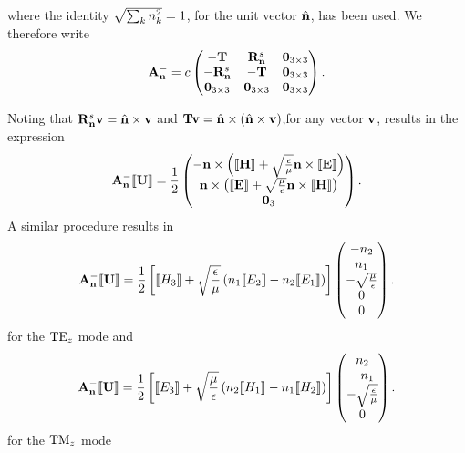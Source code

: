 where the identity $\sqrt{\sum_{k} n_{k}^2} = 1$, for the unit vector $\hat{\mathbf{n}}$, has been used. We therefore write
\begin{align*}
\mathbf{A}_\mathbf{n}^{-} = c
\begin{pmatrix}
  -\mathbf{T} & \mathbf{R}^{s}_{\mathbf{n}} & \mathbf{0}_{3\times3} \\
  -\mathbf{R}^{s}_{\mathbf{n}}  & -\mathbf{T} & \mathbf{0}_{3\times3} \\
   \mathbf{0}_{3\times3} & \mathbf{0}_{3\times3} & \mathbf{0}_{3\times3} 
\end{pmatrix} .
\end{align*}

Noting that $\mathbf{R}^{s}_{\mathbf{n}} \mathbf{v} = \hat{\mathbf{n}} \times \mathbf{v}$ and $\mathbf{T} \mathbf{v} = \hat{\mathbf{n}} \times \left(  \hat{\mathbf{n}}
  \times \mathbf{v} \right)$,for any vector $\mathbf{v}$, results in the expression
\begin{align*}
\mathbf{A}_\mathbf{n}^{-} \llbracket \mathbf{U} \rrbracket = \frac{1}{2}
\begin{pmatrix}
  -\mathbf{n} \times \left( \llbracket \mathbf{H} \rrbracket + \sqrt{\frac{\epsilon}{\mu}} \mathbf{n} \times \llbracket \mathbf{E} \rrbracket \right) \\
   \mathbf{n} \times \left( \llbracket \mathbf{E} \rrbracket + \sqrt{\frac{\mu}{\epsilon}} \mathbf{n} \times \llbracket \mathbf{H} \rrbracket \right) \\
  \mathbf{0}_3
\end{pmatrix} .
\end{align*}
A similar procedure results in
\begin{align*}
\mathbf{A}_\mathbf{n}^{-} \llbracket \mathbf{U} \rrbracket =
  \frac{1}{2}
  \left[
    \llbracket H_3 \rrbracket + \sqrt{\frac{\epsilon}{\mu}}
    \left(
      n_1 \llbracket E_2 \rrbracket - 
      n_2 \llbracket E_1 \rrbracket
    \right)
  \right]
\begin{pmatrix}
   -n_2 \\
   n_1 \\
   - \sqrt{ \frac{\mu}{\epsilon} } \\
   0  \\
   0 
\end{pmatrix} .
\end{align*}
for the $\textrm{TE}_{z}$ mode and
\begin{align*}
\mathbf{A}_\mathbf{n}^{-} \llbracket \mathbf{U} \rrbracket =
  \frac{1}{2}
  \left[
    \llbracket E_3 \rrbracket + \sqrt{\frac{\mu}{\epsilon}}
    \left(
      n_2 \llbracket H_1 \rrbracket - 
      n_1 \llbracket H_2 \rrbracket
    \right)
  \right]
\begin{pmatrix}
   n_2 \\
   -n_1 \\
   -\sqrt{ \frac{\epsilon}{\mu} } \\
   0 
\end{pmatrix} .
\end{align*}
for the $\textrm{TM}_{z}$ mode

